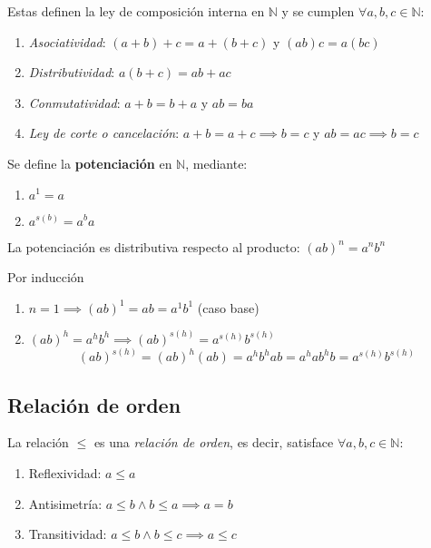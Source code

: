 Estas definen la ley de composición interna en $\mathbb{N}$ y se cumplen $\forall a, b, c \in \mathbb{N}$:
\begin{enumerate}
	\item \textit{Asociatividad}: $(a+b)+c = a + (b+c)$ y $(ab)c = a(bc)$
	\item \textit{Distributividad}: $a(b+c) = ab + ac$
	\item \textit{Conmutatividad}: $a + b = b + a$ y $ab = ba$
	\item \textit{Ley de corte o cancelación}: $a+b = a + c \implies b=c$ y $ab=ac \implies b=c$
\end{enumerate}

Se define la \textbf{potenciación} en $\mathbb{N}$, mediante: 

\begin{fmd-definition}[Potenciación en $\N$]
	\begin{enumerate}[label=\alph*)]
		\item $a^1 = a$
		\item $a^{s(b)} = a^ba$
	\end{enumerate}
\end{fmd-definition}


\begin{fmd-proposition}
	La potenciación es distributiva respecto al producto: $(ab)^n = a^n b^n$
\end{fmd-proposition}

\begin{fmd-proof}
	 Por inducción
	\begin{enumerate}[label=\roman*)]
		\item $n=1 \implies (ab)^1 = ab = a^1 b^1$ (caso base)
		\item $(ab)^h = a^h b^h \implies (ab)^{s(h)} = a^{s(h)}b^{s(h)}$
		\[ (ab)^{s(h)} = (ab)^h (ab) = a^hb^hab = a^ha b^hb = a^{s(h)}b^{s(h)} \]
	\end{enumerate}
\end{fmd-proof}


\subsection{Relación de orden}
\vspace{3mm}
\begin{fmd-definition}
	La relación $\le$ es una \textit{relación de orden}, es decir, satisface $\forall a, b, c \in \mathbb{N}$:
	\begin{enumerate}
		\item Reflexividad: $a \le a $
		\item Antisimetría: $a \le b \land b \le a \implies a=b$
		\item Transitividad: $a \le b \land b \le c \implies a \le c$
	\end{enumerate}
\end{fmd-definition}

